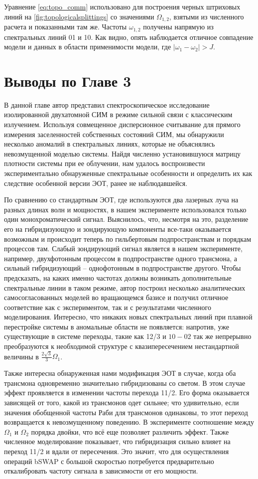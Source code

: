\documentclass[14pt, a4paper]{extreport}
\numberwithin{equation}{section}
\begin{document}
Уравнение \eqref{eq:topo_comm} использовано для построения черных штриховых линий на \autoref{fig:topologicalsplittings} со значениями $\Omega_{1,2}$, взятыми из численного расчета и показанными там же. Частоты $\omega_{1,2}$ получены напрямую из спектральных линий 01 и 10. Как видно, опять наблюдается отличное совпадение модели и данных в области применимости модели, где $|\omega_1 - \omega_2|>J$.

\section{Выводы по Главе 3}

В данной главе автор представил спектроскопическое исследование изолированной двухатомной СИМ в режиме сильной связи с классическим излучением. Используя совмещенное дисперсионное считывание для прямого измерения заселенностей собственных состояний СИМ, мы обнаружили несколько аномалий в спектральных линиях, которые не объяснялись невозмущенной моделью системы. Найдя численно установившуюся матрицу плотности системы при ее облучении, нам удалось воспроизвести экспериментально обнаруженные спектральные особенности и определить их как следствие особенной версии ЭОТ, ранее не наблюдавшейся.

По сравнению со стандартным ЭОТ, где используются два лазерных луча на разных длинах волн и мощностях, в нашем эксперименте использовался только один монохроматический сигнал. Выяснилось, что, несмотря на это, разделение его на гибридизующую и зондирующую компоненты все-таки оказывается возможным и происходит теперь по гильбертовым подпространствам и порядкам процессов там. Слабый зондирующий сигнал является в нашем эксперименте, например, двухфотонным процессом в подпространстве одного трансмона, а сильный гибридизующий -- однофотонным в подпространстве другого. Чтобы предсказать, на каких именно частотах должны возникать дополнительные спектральные линии в таком режиме, автор построил несколько аналитических самосогласованных моделей во вращающемся базисе и получил отличное соответствие как с экспериментом, так и с результатами численного моделирования. Интересно, что никаких новых спектральных линий при плавной перестройке системы в аномальные области не появляется: напротив, уже существующие в системе переходы, такие как 12/3 и $10-02$  так же непрерывно преобразуются к необходимой структуре с квазипересечением нестандартной величины в $\frac{2\sqrt{3}}{3}\Omega_1$. 

Также интересна обнаруженная нами модификация ЭОТ в случае, когда оба трансмона одновременно значительно гибридизованы со светом. В этом случае эффект проявляется в изменении частоты перехода 11/2. Его форма оказывается зависящей от того, какой из трансмонов одет сильнее; что удивительно, если значения обобщенной частоты Раби для трансмонов одинаковы, то этот переход возвращается к невозмущенному поведению. В эксперименте соотношение между $\Omega_1$ и $\Omega_2$ порядка двойки, что всё еще позволяет различить эффект. Также численное моделирование показывает, что гибридизация сильно влияет на переход 11/2 и вдали от пересечения. Это значит, что для осуществления операций bSWAP с большой скоростью потребуется предварительно откалибровать частоту сигнала в зависимости от его мощности.
\end{document}
